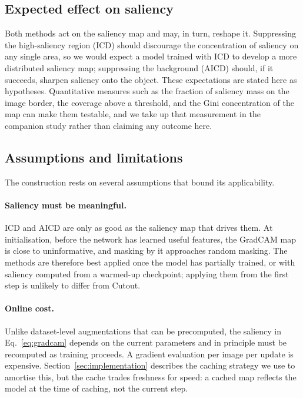 \subsection{Expected effect on saliency}
\label{sec:discussion:saliency}

Both methods act on the saliency map and may, in turn, reshape it.  Suppressing
the high-saliency region (ICD) should discourage the concentration of saliency
on any single area, so we would expect a model trained with ICD to develop a
more distributed saliency map; suppressing the background (AICD) should, if it
succeeds, sharpen saliency onto the object.  These expectations are stated here
as hypotheses.  Quantitative measures such as the fraction of saliency mass on
the image border, the coverage above a threshold, and the Gini concentration of
the map can make them testable, and we take up that measurement in the companion
study rather than claiming any outcome here.

\subsection{Assumptions and limitations}
\label{sec:discussion:limits}

The construction rests on several assumptions that bound its applicability.

\paragraph{Saliency must be meaningful.}
ICD and AICD are only as good as the saliency map that drives them.  At
initialisation, before the network has learned useful features, the GradCAM map
is close to uninformative, and masking by it approaches random masking.  The
methods are therefore best applied once the model has partially trained, or with
saliency computed from a warmed-up checkpoint; applying them from the first step
is unlikely to differ from Cutout.

\paragraph{Online cost.}
Unlike dataset-level augmentations that can be precomputed, the saliency in
Eq.~\eqref{eq:gradcam} depends on the current parameters and in principle must
be recomputed as training proceeds.  A gradient evaluation per image per update
is expensive.  Section~\ref{sec:implementation} describes the caching strategy
we use to amortise this, but the cache trades freshness for speed: a cached map
reflects the model at the time of caching, not the current step.


